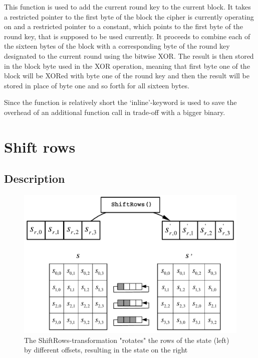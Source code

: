 This function is used to add the current round key to the current block.
It takes a restricted pointer to the first byte of the block the cipher
is currently operating on and a restricted pointer to a constant, which
points to the first byte of the round key, that is supposed to be used
currently. It proceeds to combine each of the sixteen bytes of the block
with a corresponding byte of the round key designated to the current
round using the bitwise \ac{XOR}. The result is then stored in the block byte
used in the \ac{XOR} operation, meaning that first byte one of the block will
be \ac{XOR}ed with byte one of the round key and then the result will be
stored in place of byte one and so forth for all sixteen bytes.

Since the function is relatively short the `inline'-keyword is used to
save the overhead of an additional function call in trade-off with a
bigger binary.

\hypertarget{shift-rows}{%
\section{Shift rows}\label{shift-rows}}

\hypertarget{description-3}{%
\subsection{Description}\label{description-3}}

\begin{figure}
\centering
\includegraphics[scale = 0.3]{data/figures/shiftrows.png}
\caption{The ShiftRows-transformation "rotates" the rows of the state (left) by different offsets, resulting in the state on the right \cite[ch. 5.1.2]{aes2001}}
\end{figure}

